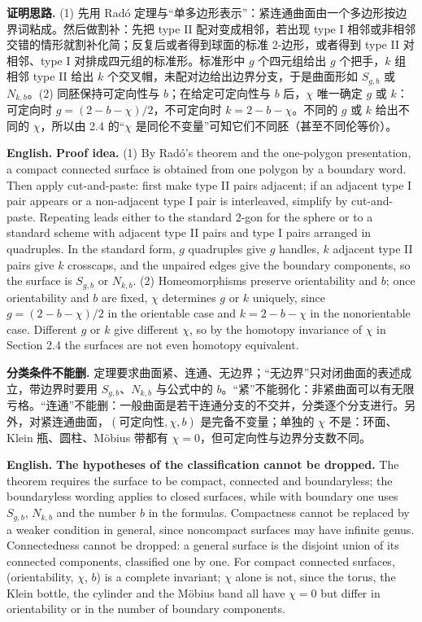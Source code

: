 \documentclass[UTF8,11pt,a4paper]{ctexart}
\newcommand{\EN}[1]{\par\noindent\textbf{English.} #1\par}
\begin{document}
\noindent\textbf{证明思路.} (1) 先用 Rad\'o 定理与“单多边形表示”：紧连通曲面由一个多边形按边界词粘成。然后做割补：先把 type II 配对变成相邻，若出现 type I 相邻或非相邻交错的情形就割补化简；反复后或者得到球面的标准 2-边形，或者得到 type II 对相邻、type I 对排成四元组的标准形。标准形中 $g$ 个四元组给出 $g$ 个把手，$k$ 组相邻 type II 给出 $k$ 个交叉帽，未配对边给出边界分支，于是曲面形如 $S_{g,b}$ 或 $N_{k,b}$。(2) 同胚保持可定向性与 $b$；在给定可定向性与 $b$ 后，$\chi$ 唯一确定 $g$ 或 $k$：可定向时 $g=(2-b-\chi)/2$，不可定向时 $k=2-b-\chi$。不同的 $g$ 或 $k$ 给出不同的 $\chi$，所以由 2.4 的“$\chi$ 是同伦不变量”可知它们不同胚（甚至不同伦等价）。
\EN{\textbf{Proof idea.} (1) By Rad\'o's theorem and the one-polygon presentation, a compact connected surface is obtained from one polygon by a boundary word. Then apply cut-and-paste: first make type II pairs adjacent; if an adjacent type I pair appears or a non-adjacent type I pair is interleaved, simplify by cut-and-paste. Repeating leads either to the standard 2-gon for the sphere or to a standard scheme with adjacent type II pairs and type I pairs arranged in quadruples. In the standard form, $g$ quadruples give $g$ handles, $k$ adjacent type II pairs give $k$ crosscaps, and the unpaired edges give the boundary components, so the surface is $S_{g,b}$ or $N_{k,b}$. (2) Homeomorphisms preserve orientability and $b$; once orientability and $b$ are fixed, $\chi$ determines $g$ or $k$ uniquely, since $g=(2-b-\chi)/2$ in the orientable case and $k=2-b-\chi$ in the nonorientable case. Different $g$ or $k$ give different $\chi$, so by the homotopy invariance of $\chi$ in Section 2.4 the surfaces are not even homotopy equivalent.}

\noindent\textbf{分类条件不能删.} 定理要求曲面紧、连通、无边界；“无边界”只对闭曲面的表述成立，带边界时要用 $S_{g,b}$、$N_{k,b}$ 与公式中的 $b$。“紧”不能弱化：非紧曲面可以有无限亏格。“连通”不能删：一般曲面是若干连通分支的不交并，分类逐个分支进行。另外，对紧连通曲面，$(\text{可定向性},\chi,b)$ 是完备不变量；单独的 $\chi$ 不是：环面、Klein 瓶、圆柱、M\"obius 带都有 $\chi=0$，但可定向性与边界分支数不同。
\EN{\textbf{The hypotheses of the classification cannot be dropped.} The theorem requires the surface to be compact, connected and boundaryless; the boundaryless wording applies to closed surfaces, while with boundary one uses $S_{g,b}$, $N_{k,b}$ and the number $b$ in the formulas. Compactness cannot be replaced by a weaker condition in general, since noncompact surfaces may have infinite genus. Connectedness cannot be dropped: a general surface is the disjoint union of its connected components, classified one by one. For compact connected surfaces, (orientability, $\chi$, $b$) is a complete invariant; $\chi$ alone is not, since the torus, the Klein bottle, the cylinder and the M\"obius band all have $\chi=0$ but differ in orientability or in the number of boundary components.}
\end{document}
